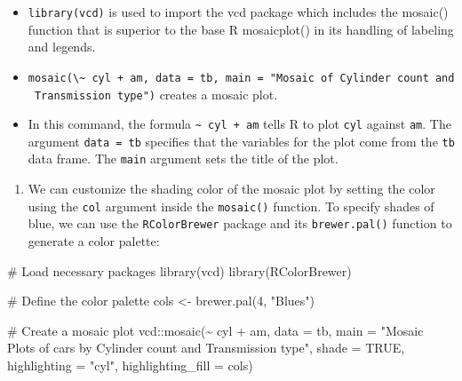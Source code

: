 \documentclass[
  letterpaper,
  DIV=11,
  numbers=noendperiod]{scrreport}
\newenvironment{Shaded}{\begin{snugshade}}{\end{snugshade}}
\newcommand{\AttributeTok}[1]{\textcolor[rgb]{0.40,0.45,0.13}{#1}}
\newcommand{\CommentTok}[1]{\textcolor[rgb]{0.37,0.37,0.37}{#1}}
\newcommand{\ConstantTok}[1]{\textcolor[rgb]{0.56,0.35,0.01}{#1}}
\newcommand{\DecValTok}[1]{\textcolor[rgb]{0.68,0.00,0.00}{#1}}
\newcommand{\FunctionTok}[1]{\textcolor[rgb]{0.28,0.35,0.67}{#1}}
\newcommand{\NormalTok}[1]{\textcolor[rgb]{0.00,0.23,0.31}{#1}}
\newcommand{\OtherTok}[1]{\textcolor[rgb]{0.00,0.23,0.31}{#1}}
\newcommand{\SpecialCharTok}[1]{\textcolor[rgb]{0.37,0.37,0.37}{#1}}
\newcommand{\StringTok}[1]{\textcolor[rgb]{0.13,0.47,0.30}{#1}}
\providecommand{\tightlist}{%
  \setlength{\itemsep}{0pt}\setlength{\parskip}{0pt}}\usepackage{longtable,booktabs,array}
\begin{document}
\begin{itemize}
\item
  \texttt{library(vcd)} is used to import the vcd package which includes
  the mosaic() function that is superior to the base R mosaicplot() in
  its handling of labeling and legends.
\item
  \texttt{mosaic(\textbackslash{}\textasciitilde{}\ cyl\ +\ am,\ data\ =\ tb,\ main\ =\ "Mosaic\ of\ Cylinder\ count\ and\ Transmission\ type")}
  creates a mosaic plot.
\item
  In this command, the formula \texttt{\textasciitilde{}\ cyl\ +\ am}
  tells R to plot \texttt{cyl} against \texttt{am}. The argument
  \texttt{data\ =\ tb} specifies that the variables for the plot come
  from the \texttt{tb} data frame. The \texttt{main} argument sets the
  title of the plot.
\end{itemize}

\begin{enumerate}
\def\labelenumi{\arabic{enumi}.}
\setcounter{enumi}{7}
\tightlist
\item
  We can customize the shading color of the mosaic plot by setting the
  color using the \texttt{col} argument inside the \texttt{mosaic()}
  function. To specify shades of blue, we can use the
  \texttt{RColorBrewer} package and its \texttt{brewer.pal()} function
  to generate a color palette:
\end{enumerate}

\begin{Shaded}
\begin{Highlighting}[]
\CommentTok{\# Load necessary packages}
\FunctionTok{library}\NormalTok{(vcd)}
\FunctionTok{library}\NormalTok{(RColorBrewer)}

\CommentTok{\# Define the color palette}
\NormalTok{cols }\OtherTok{\textless{}{-}} \FunctionTok{brewer.pal}\NormalTok{(}\DecValTok{4}\NormalTok{, }\StringTok{"Blues"}\NormalTok{)}

\CommentTok{\# Create a mosaic plot}
\NormalTok{vcd}\SpecialCharTok{::}\FunctionTok{mosaic}\NormalTok{(}\SpecialCharTok{\textasciitilde{}}\NormalTok{ cyl }\SpecialCharTok{+}\NormalTok{ am, }
       \AttributeTok{data =}\NormalTok{ tb, }
       \AttributeTok{main =} \StringTok{"Mosaic Plots of cars by Cylinder count and Transmission type"}\NormalTok{,}
       \AttributeTok{shade =} \ConstantTok{TRUE}\NormalTok{,}
       \AttributeTok{highlighting =} \StringTok{"cyl"}\NormalTok{, }
       \AttributeTok{highlighting\_fill =}\NormalTok{ cols)}
\end{Highlighting}
\end{Shaded}
\end{document}
